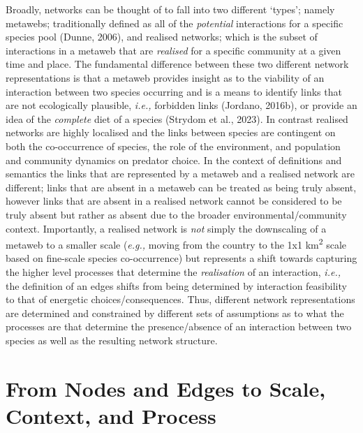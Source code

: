 \documentclass[
]{article}
\begin{document}
Broadly, networks can be thought of to fall into two different `types';
namely metawebs; traditionally defined as all of the \emph{potential}
interactions for a specific species pool (Dunne, 2006), and realised
networks; which is the subset of interactions in a metaweb that are
\emph{realised} for a specific community at a given time and place. The
fundamental difference between these two different network
representations is that a metaweb provides insight as to the viability
of an interaction between two species occurring and is a means to
identify links that are not ecologically plausible, \emph{i.e.,}
forbidden links (Jordano, 2016b), or provide an idea of the
\emph{complete} diet of a species (Strydom et al., 2023). In contrast
realised networks are highly localised and the links between species are
contingent on both the co-occurrence of species, the role of the
environment, and population and community dynamics on predator choice.
In the context of definitions and semantics the links that are
represented by a metaweb and a realised network are different; links
that are absent in a metaweb can be treated as being truly absent,
however links that are absent in a realised network cannot be considered
to be truly absent but rather as absent due to the broader
environmental/community context. Importantly, a realised network is
\emph{not} simply the downscaling of a metaweb to a smaller scale
(\emph{e.g.,} moving from the country to the 1x1 km\textsuperscript{2}
scale based on fine-scale species co-occurrence) but represents a shift
towards capturing the higher level processes that determine the
\emph{realisation} of an interaction, \emph{i.e.,} the definition of an
edges shifts from being determined by interaction feasibility to that of
energetic choices/consequences. Thus, different network representations
are determined and constrained by different sets of assumptions as to
what the processes are that determine the presence/absence of an
interaction between two species as well as the resulting network
structure.

\section{From Nodes and Edges to Scale, Context, and
Process}\label{sec-process}
\end{document}
